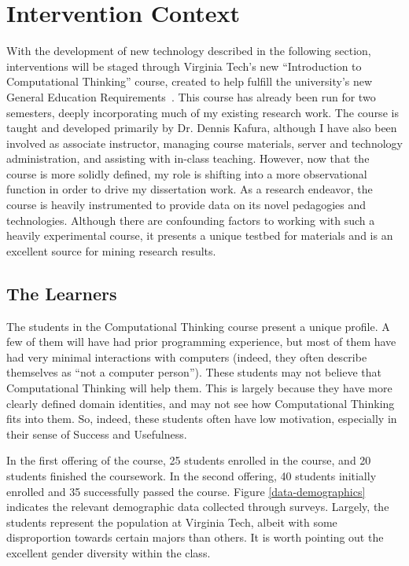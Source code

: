 \section{Intervention Context}

With the development of new technology described in the following section, interventions will be staged through Virginia Tech's new ``Introduction to Computational Thinking'' course, created to help fulfill the university's new General Education Requirements~\cite{vt-vision}. 
This course has already been run for two semesters, deeply incorporating much of my existing research work.
The course is taught and developed primarily by Dr. Dennis Kafura, although I have also been involved as associate instructor, managing course materials, server and technology administration, and assisting with in-class teaching.
However, now that the course is more solidly defined, my role is shifting into a more observational function in order to drive my dissertation work.
As a research endeavor, the course is heavily instrumented to provide data on its novel pedagogies and technologies.
Although there are confounding factors to working with such a heavily experimental course, it presents a unique testbed for materials and is an excellent source for mining research results.

\subsection{The Learners}

The students in the Computational Thinking course present a unique profile.
A few of them will have had prior programming experience, but most of them have had very minimal interactions with computers (indeed, they often describe themselves as ``not a computer person'').
These students may not believe that Computational Thinking will help them.
This is largely because they have more clearly defined domain identities, and may not see how Computational Thinking fits into them.
So, indeed, these students often have low motivation, especially in their sense of Success and Usefulness.

In the first offering of the course, 25 students enrolled in the course, and 20 students finished the coursework.
In the second offering, 40 students initially enrolled and 35 successfully passed the course.
Figure \ref{data-demographics} indicates the relevant demographic data collected through surveys.
Largely, the students represent the population at Virginia Tech, albeit with some disproportion towards certain majors than others.
It is worth pointing out the excellent gender diversity within the class.


